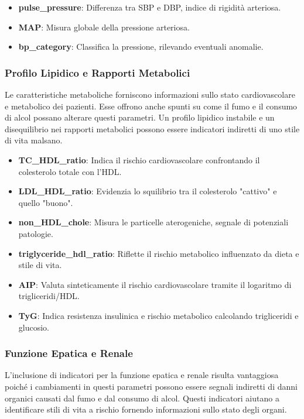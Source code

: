 \documentclass{article}
\begin{document}
\begin{multicols}{2}
\begin{itemize}[leftmargin=*]
    \item \textbf{pulse\_pressure}: Differenza tra SBP e DBP, indice di rigidità arteriosa.
    \item \textbf{MAP}: Misura globale della pressione arteriosa.
    \item \textbf{bp\_category}: Classifica la pressione, rilevando eventuali anomalie.
\end{itemize}

\subsubsection{Profilo Lipidico e Rapporti Metabolici}

Le caratteristiche metaboliche forniscono informazioni sullo stato cardiovascolare e metabolico dei pazienti. Esse offrono anche spunti su come il fumo e il consumo di alcol possano alterare questi parametri. Un profilo lipidico instabile e un disequilibrio nei rapporti metabolici possono essere indicatori indiretti di uno stile di vita malsano.

\begin{itemize}[leftmargin=*]
    \item \textbf{TC\_HDL\_ratio}: Indica il rischio cardiovascolare confrontando il colesterolo totale con l'HDL.
    \item \textbf{LDL\_HDL\_ratio}: Evidenzia lo squilibrio tra il colesterolo "cattivo" e quello "buono".
    \item \textbf{non\_HDL\_chole}: Misura le particelle aterogeniche, segnale di potenziali patologie.
    \item \textbf{triglyceride\_hdl\_ratio}: Riflette il rischio metabolico influenzato da dieta e stile di vita.
    \item \textbf{AIP}: Valuta sinteticamente il rischio cardiovascolare tramite il logaritmo di trigliceridi/HDL.
    \item \textbf{TyG}: Indica resistenza insulinica e rischio metabolico calcolando trigliceridi e glucosio.
\end{itemize}

\subsubsection{Funzione Epatica e Renale}

L'inclusione di indicatori per la funzione epatica e renale risulta vantaggiosa poiché i cambiamenti in questi parametri possono essere segnali indiretti di danni organici causati dal fumo e dal consumo di alcol. Questi indicatori aiutano a identificare stili di vita a rischio fornendo informazioni sullo stato degli organi.


\end{multicols}
\end{document}
